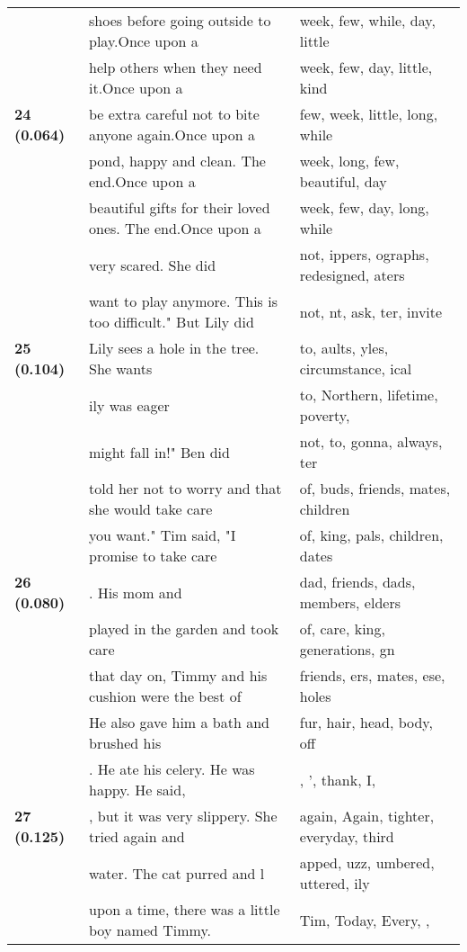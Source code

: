 \documentclass{article}
\begin{document}
\begin{adjustbox}{max width=\textwidth}
\begin{tabular}{p{} p{} p{}}
\midrule
\multirow{5}{*}{\textbf{24 (0.064)}} & shoes before going outside to play.Once upon a & week,  few,  while,  day,  little \\
 & help others when they need it.Once upon a & week,  few,  day,  little,  kind \\
 & be extra careful not to bite anyone again.Once upon a & few,  week,  little,  long,  while \\
 & pond, happy and clean. The end.Once upon a & week,  long,  few,  beautiful,  day \\
 & beautiful gifts for their loved ones. The end.Once upon a & week,  few,  day,  long,  while \\
\midrule
\multirow{5}{*}{\textbf{25 (0.104)}} & very scared. She did & not, ippers, ographs,  redesigned, aters \\
 & want to play anymore. This is too difficult." But Lily did & not, nt,  ask, ter,  invite \\
 & Lily sees a hole in the tree. She wants & to, aults, yles,  circumstance, ical \\
 & ily was eager & to,  Northern,  lifetime,  poverty, \\
 & might fall in!"  Ben did & not,  to,  gonna,  always, ter \\
\midrule
\multirow{5}{*}{\textbf{26 (0.080)}} & told her not to worry and that she would take care & of,  buds,  friends, mates,  children \\
 & you want." Tim said, "I promise to take care & of, king,  pals,  children, dates \\
 & . His mom and & dad,  friends,  dads,  members,  elders \\
 & played in the garden and took care & of, care, king,  generations,  gn \\
 & that day on, Timmy and his cushion were the best of & friends, ers, mates, ese, holes \\
\midrule
\multirow{5}{*}{\textbf{27 (0.125)}} & He also gave him a bath and brushed his & fur,  hair,  head,  body,  off \\
 & . He ate his celery. He was happy. He said, & ,  ',  thank,  I, \\
 & , but it was very slippery. She tried again and & again,  Again,  tighter,  everyday,  third \\
 & water. The cat purred and l & apped, uzz, umbered, uttered, ily \\
 & upon a time, there was a little boy named Timmy. & Tim,  Today,  Every,  , \\

\end{tabular}
\end{adjustbox}
\end{document}
